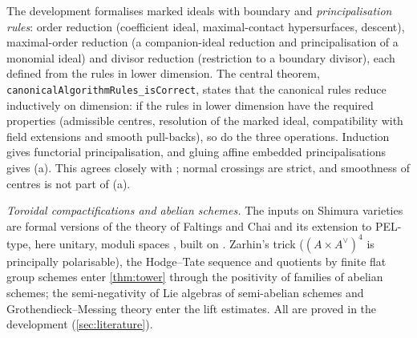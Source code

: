 \begin{proofoutline}
The development formalises marked ideals with boundary and \emph{principalisation rules}: order
reduction (coefficient ideal, maximal-contact hypersurfaces, descent), maximal-order reduction (a
companion-ideal reduction and principalisation of a monomial ideal) and divisor reduction (restriction
to a boundary divisor), each defined from the rules in lower dimension. The central theorem,
\texttt{canonicalAlgorithmRules\_\allowbreak isCorrect}, states that the canonical rules reduce inductively on
dimension: if the rules in lower dimension have the required properties (admissible centres, resolution
of the marked ideal, compatibility with field extensions and smooth pull-backs), so do the three
operations. Induction gives functorial principalisation, and gluing affine embedded principalisations
gives (a). This agrees closely with \cite{BierstoneMilman1997,Wlodarczyk2005,Kollar2007}; normal crossings
are strict, and smoothness of centres is not part of (a).
\end{proofoutline}

\emph{Toroidal compactifications and abelian schemes.} The inputs on Shimura varieties are formal
versions of the theory of Faltings and Chai \cite{FaltingsChai1990} and its extension to PEL-type, here
unitary, moduli spaces \cite{Lan2013}, built on \cite{AshMumfordRapoportTai1975}. Zarhin's trick
\cite{Zarhin1975,Zarhin1985} ($(A\times A^\vee)^4$ is principally polarisable), the Hodge--Tate sequence
\cite{Faltings1988,FarguesGenestierLafforgue2008} and quotients by finite flat group schemes enter
\cref{thm:tower} through the positivity of families of abelian schemes; the semi-negativity of Lie
algebras of semi-abelian schemes \cite{FaltingsChai1990,MoretBailly1985} and Grothendieck--Messing
theory \cite{Messing1972} enter the lift estimates. All are proved in the development
(\cref{sec:literature}).
